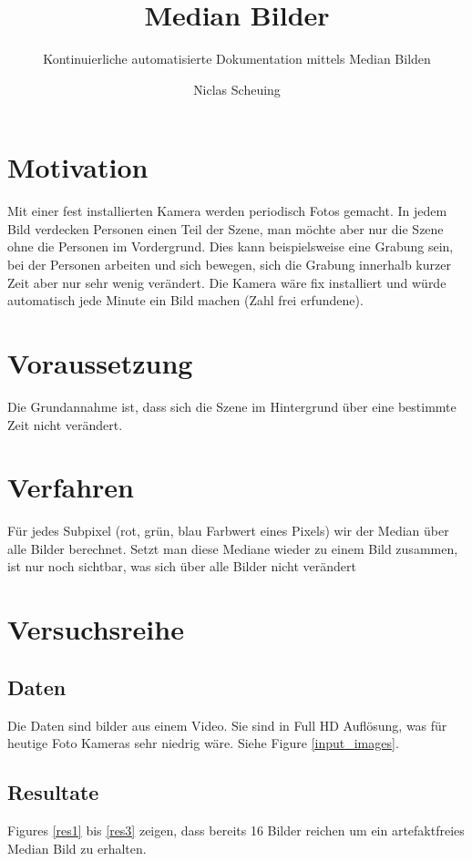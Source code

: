 \documentclass{paper}
\begin{document}
	\title{Median Bilder}
	\subtitle{Kontinuierliche automatisierte Dokumentation mittels Median Bilden}
	
	\author{Niclas Scheuing}
	
	\maketitle
	
	\section{Motivation}
		Mit einer fest installierten Kamera werden periodisch Fotos gemacht. In jedem Bild verdecken Personen einen Teil der Szene, man möchte aber nur die Szene ohne die Personen im Vordergrund.
		Dies kann beispielsweise eine Grabung sein, bei der Personen arbeiten und sich bewegen, sich die Grabung innerhalb kurzer Zeit aber nur sehr wenig verändert. Die Kamera wäre fix installiert und würde automatisch jede Minute ein Bild machen (Zahl frei erfundene).

	\section{Voraussetzung}
		Die Grundannahme ist, dass sich die Szene im Hintergrund über eine bestimmte Zeit nicht verändert.

	\section{Verfahren}
		Für jedes Subpixel (rot, grün, blau Farbwert eines Pixels) wir der Median über alle Bilder berechnet. Setzt man diese Mediane wieder zu einem Bild zusammen, ist nur noch sichtbar, was sich über alle Bilder nicht verändert
	
	\section{Versuchsreihe}
		\subsection{Daten}
			Die Daten sind bilder aus einem Video. Sie sind in Full HD Auflösung, was für heutige Foto Kameras sehr niedrig wäre.
			Siehe Figure \ref{input_images}.
		\subsection{Resultate}
			Figures \ref{res1} bis \ref{res3} zeigen, dass bereits 16 Bilder reichen um ein artefaktfreies Median Bild zu erhalten.
\end{document}
